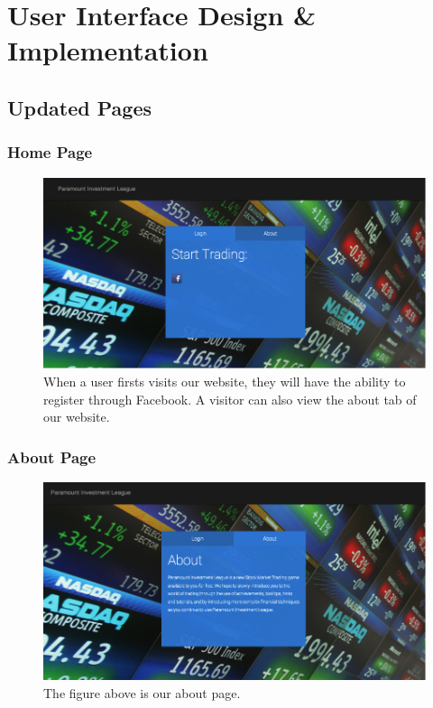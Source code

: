 \chapter{User Interface Design \& Implementation}

\section{Updated Pages}

\subsection{Home Page}
\begin{figure}[H]
\centering
\includegraphics[width=5.5in]{./img/ui/1.png}
\caption{When a user firsts visits our website, they will have the ability to register through Facebook. A visitor can also view the about tab of our website.}
\end{figure}

\subsection{About Page}
\begin{figure}[H]
\centering
\includegraphics[width=5.5in]{./img/ui/2.png}
\caption{The figure above is our about page.}
\end{figure}

